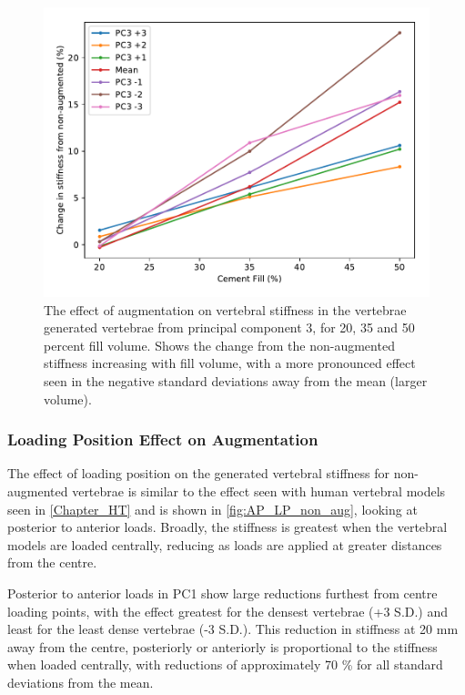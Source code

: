 \begin{figure}[h]
  \centering
  \includegraphics[width=.9\textwidth]{Chapters/Chapter_PCA_images/pca_percent_fill_pc3.pdf}
  \caption[Effect of augmentation in principal component 3.]{The effect of
	augmentation on vertebral stiffness in the vertebrae generated
	vertebrae from principal component 3, for 20, 35 and 50 percent fill
	volume. Shows the change from the non-augmented stiffness increasing
	with fill volume, with a more pronounced effect seen in the negative
	standard deviations away from the mean (larger volume).}
  \label{fig:pca_percent_fill_pc3}
\end{figure}


\subsubsection{Loading Position Effect on Augmentation }


The effect of loading position on the generated vertebral stiffness for
non-augmented vertebrae is similar to the effect seen with human vertebral
models seen in \cref{Chapter_HT} and is shown in \cref{fig:AP_LP_non_aug},
looking at posterior to anterior loads.  Broadly, the stiffness is greatest
when the vertebral models are loaded centrally, reducing as loads are applied
at greater distances from the centre.

Posterior to anterior loads in PC1 show large reductions furthest from centre
loading points, with the effect greatest for the densest vertebrae (+3 S.D.)
and least for the least dense vertebrae (-3 S.D.).  This reduction in stiffness
at 20 mm away from the centre, posteriorly or anteriorly is proportional to the
stiffness when loaded centrally, with reductions of approximately 70 \% for all
standard deviations from the mean.


